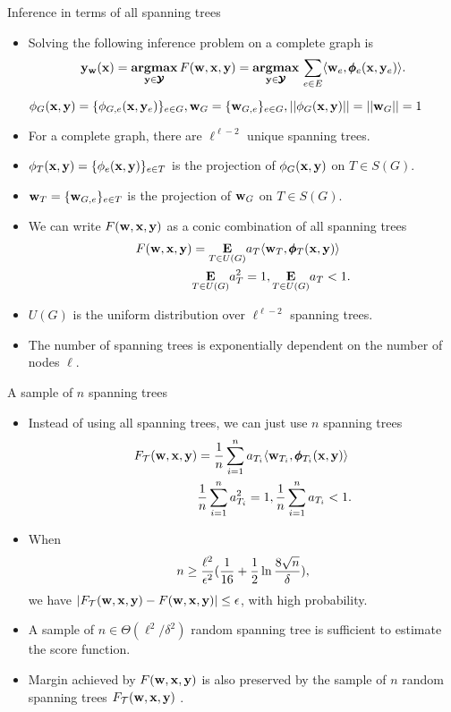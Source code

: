 \documentclass[first=dgreen,second=purple,logo=yellowexc]{aaltoslides}
\begin{document}
\begin{frame}{Inference in terms of all spanning trees}
	\begin{itemize}
		\item Solving the following inference problem on a complete graph is \nphard
		\begin{align*}
			\mathbf {y}_{\mathbf {w}}(\mathbf {x}) = \underset{\mathbf {y}\in\pmb {\mathcal{Y}}}{\textbf{argmax}}\,F(\mathbf {w},\mathbf {x},\mathbf {y})  = \underset{\mathbf {y}\in\pmb {\mathcal{Y}}}{\textbf{argmax}}\,\sum_{e\in E}\langle \mathbf {w}_e, \pmb \phi_e(\mathbf {x},\mathbf {y}_e) \rangle. 
		\end{align*}
		$\phi_G(\mathbf {x},\mathbf {y}) = \{\phi_{G,e}(\mathbf {x},\mathbf {y}_e)\}_{e\in G},\mathbf {w}_G = \{\mathbf {w}_{G,e}\}_{e\in G},||\phi_G(\mathbf {x},\mathbf {y})||=||\mathbf {w}_{G}||=1$
		\item For a complete graph, there are $\ell^{\ell-2}$ unique spanning trees.
		\item $\phi_T(\mathbf {x},\mathbf {y})=\{\phi_e(\mathbf {x},\mathbf {y})\}_{e\in T}$ is the projection of $\phi_G(\mathbf {x},\mathbf {y})$ on $T\in S(G)$.
		\item $\mathbf {w}_{T}=\{\mathbf {w}_{G,e}\}_{e\in T}$ is the projection of $\mathbf {w}_G$ on $T\in S(G)$.
		\item We can write $F(\mathbf {w},\mathbf {x},\mathbf {y})$ as a conic combination of all spanning trees
		\begin{align*}
			F(\mathbf {w},\mathbf {x},\mathbf {y}) &= \underset{T\in U(G)}{\textbf{E}}a_T\langle \mathbf {w}_T, \pmb \phi_T(\mathbf {x},\mathbf {y}) \rangle\\
			  &\underset{T\in U(G)}{\textbf{E}}a_T^2=1,  \underset{T\in U(G)}{\textbf{E}}a_T<1.
		\end{align*}
		\item $U(G)$ is the uniform distribution over $\ell^{\ell-2}$ spanning trees.
		\item The number of spanning trees is exponentially dependent on the number of nodes $\ell$.
	\end{itemize}
\end{frame}

%
\begin{frame}{A sample of $n$ spanning trees}
	\begin{itemize}\footnotesize
		\item Instead of using all spanning trees, we can just use $n$ spanning trees
		\begin{align*}\footnotesize
			F_{\mathcal{T}}(\mathbf {w},\mathbf {x},\mathbf {y}) &= \frac{1}{n}\sum_{i=1}^{n}a_{T_i}\langle \mathbf {w}_{T_i}, \pmb \phi_{T_i}(\mathbf {x},\mathbf {y}) \rangle\\
			  &\frac{1}{n}\sum_{i=1}^{n}a_{T_i}^2=1,  \frac{1}{n}\sum_{i=1}^{n}a_{T_i}<1.
		\end{align*}
		\item When
		\begin{align*}\footnotesize
			n\ge\frac{\ell^2}{\epsilon^2}(\frac{1}{16}+\frac{1}{2}\ln\frac{8\sqrt{n}}{\delta}),
		\end{align*}
		we have $|F_{\mathcal{T}}(\mathbf {w},\mathbf {x},\mathbf {y})-F(\mathbf {w},\mathbf {x},\mathbf {y})|\le\epsilon$, with high probability.
		\item A sample of $n\in\Theta(\ell^2/\delta^2)$ random spanning tree is sufficient to estimate the score function.
		\item Margin achieved by $F(\mathbf {w},\mathbf {x},\mathbf {y})$ is also preserved by the sample of $n$ random spanning trees $F_{\mathcal{T}}(\mathbf {w},\mathbf {x},\mathbf {y})$ \cite{su14multilabelnips}.
	\end{itemize}
\end{frame}
\end{document}
